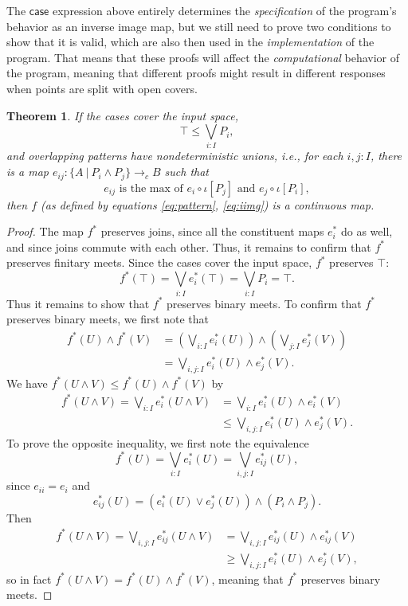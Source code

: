 \documentclass[conference]{IEEEtran}
\newtheorem{theorem}{Theorem}
\newcommand{\cto}{\to_c}
\newcommand{\suchthat}{\ |\ }
\newcommand{\oinclf}[1]{\iota[{#1}]}
\newcommand{\isthemaxof}[3]{{#1}\text{ is the max of }{#2}\text{ and }{#3}}
\newcommand{\iimg}[1]{#1^*}
\newcommand{\grammar}[1]{\textcolor{red}{\underline{#1}}}
\renewcommand{\grammar}[1]{#1}
\begin{document}
The $\mathsf{case}$ expression above entirely determines the \emph{specification} of the program's behavior as an inverse image map, but we still need to prove two conditions to show that it is valid, which are also then used in the \emph{implementation} of the program. \grammar{That} means that these proofs will affect the \emph{computational} behavior of the program, meaning that different proofs might result in different responses when points are split with open covers. 
\begin{theorem}
\label{pattern}
If the cases cover the input space,
\[
\top \le \bigvee_{i : I} P_i \tag{covering},
\]
and overlapping patterns have nondeterministic unions, i.e., for each $i, j : I$, there is a map $e_{ij} : \{A \suchthat P_i \wedge P_j \} \cto B$ such that
\[
\isthemaxof{ e_{ij} }{ e_i \circ \oinclf{P_j} }{ e_j \circ \oinclf{P_i} }, \tag{gluing}
\]
then $f$ (as defined by equations \ref{eq:pattern}, \ref{eq:iimg})
is a continuous map.
\end{theorem}
\begin{proof}
The map $\iimg{f}$ preserves joins, since all the constituent maps $\iimg{e_i}$ do as well, and since joins commute with each other. Thus, it remains to confirm that $\iimg{f}$ preserves finitary meets.
Since the cases cover the input space, $\iimg{f}$ preserves $\top$:
\[
\iimg{f}(\top) = \bigvee_{i : I} \iimg{e_i}(\top) = \bigvee_{i : I}P_i = \top.
\]
Thus it remains to show that $\iimg{f}$ preserves binary meets.
To confirm that $\iimg{f}$ preserves binary meets, we first note that
\begin{align*}
\iimg{f}(U) \wedge \iimg{f}(V) 
  &= \left(\bigvee_{i : I} \iimg{e_i}(U) \right) \wedge \left( \bigvee_{j: I} \iimg{e_j}(V) \right)
\\ &= \bigvee_{i, j : I} \iimg{e_i}(U) \wedge \iimg{e_j}(V).
\end{align*}
We have $\iimg{f}(U \wedge V) \le \iimg{f}(U) \wedge \iimg{f}(V)$ by
\begin{align*}
\iimg{f}(U \wedge V)
  = \bigvee_{i : I} \iimg{e_i}(U \wedge V)
  &= \bigvee_{i : I} \iimg{e_i}(U) \wedge \iimg{e_i}(V)
  \\ &\le \bigvee_{i, j : I} \iimg{e_i}(U) \wedge \iimg{e_j}(V).
\end{align*}
To prove the opposite inequality, we first note the equivalence
\[
\iimg{f}(U) = \bigvee_{i : I} \iimg{e_i}(U) = \bigvee_{i, j : I} \iimg{e_{ij}}(U),
\]
since $e_{ii} = e_i$ and 
\[
\iimg{e_{ij}}(U) = \left( \iimg{e_i}(U) \vee \iimg{e_j}(U) \right) \wedge \left(P_i \wedge P_j \right).
\]
Then
\begin{align*}
\iimg{f}(U \wedge V)
  = \bigvee_{i, j : I} \iimg{e_{ij}}(U \wedge V)
  &= \bigvee_{i, j : I} \iimg{e_{ij}}(U) \wedge \iimg{e_{ij}}(V)
  \\ &\ge \bigvee_{i, j : I} \iimg{e_i}(U) \wedge \iimg{e_j}(V),
\end{align*}
so in fact $\iimg{f}(U \wedge V) = \iimg{f}(U) \wedge \iimg{f}(V)$, meaning that $\iimg{f}$ preserves binary meets.
\end{proof}
\end{document}
